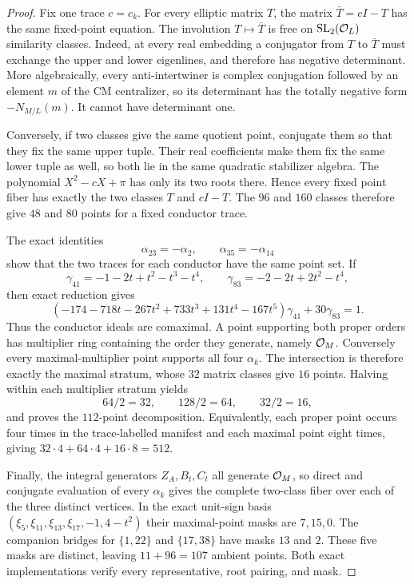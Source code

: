 \begin{proof}
Fix one trace $c=c_k$.  For every elliptic matrix $T$, the matrix
$\bar T=cI-T$ has the same fixed-point equation.  The involution
$T\mapsto\bar T$ is free on $\mathrm{SL}_2(\mathcal O_L)$ similarity classes.  Indeed,
at every real embedding a conjugator from $T$ to $\bar T$ must exchange the
upper and lower eigenlines, and therefore has negative determinant.  More
algebraically, every anti-intertwiner is complex conjugation followed by an
element $m$ of the CM centralizer, so its determinant has the totally negative
form $-N_{M/L}(m)$.  It cannot have determinant one.

Conversely, if two classes give the same quotient point, conjugate them so
that they fix the same upper tuple.  Their real coefficients make them fix the
same lower tuple as well, so both lie in the same quadratic stabilizer algebra.
The polynomial $X^2-cX+\pi$ has only its two roots there.  Hence every fixed
point fiber has exactly the two classes $T$ and $cI-T$.  The $96$ and $160$
classes therefore give $48$ and $80$ points for a fixed conductor trace.

The exact identities
\[
 \alpha_{23}=-\alpha_2,\qquad \alpha_{35}=-\alpha_{14}
\]
show that the two traces for each conductor have the same point set.  If
\[
 \gamma_{41}=-1-2t+t^2-t^3-t^4,
 \qquad \gamma_{83}=-2-2t+2t^2-t^4,
\]
then exact reduction gives
\[
 (-174-718t-267t^2+733t^3+131t^4-167t^5)\gamma_{41}
 +30\gamma_{83}=1.
\]
Thus the conductor ideals are comaximal.  A point supporting both proper
orders has multiplier ring containing the order they generate, namely $\mathcal O_M$.
Conversely every maximal-multiplier point supports all four $\alpha_k$.
The intersection is therefore exactly the maximal stratum, whose $32$ matrix
classes give $16$ points.  Halving within each multiplier stratum yields
\[
64/2=32,\qquad 128/2=64,\qquad 32/2=16,
\]
and proves the $112$-point decomposition.  Equivalently, each proper point
occurs four times in the trace-labelled manifest and each maximal point eight
times, giving $32\cdot4+64\cdot4+16\cdot8=512$.

Finally, the integral generators $Z_A,B_t,C_t$ all generate $\mathcal O_M$, so direct
and conjugate evaluation of every $\alpha_k$ gives the complete two-class
fiber over each of the three distinct vertices.  In the exact unit-sign basis
$(\xi_5,\xi_{11},\xi_{13},\xi_{17},-1,4-t^2)$ their maximal-point masks are
$7,15,0$.  The companion bridges for $\{1,22\}$ and $\{17,38\}$ have masks
$13$ and $2$.  These five masks are distinct, leaving $11+96=107$ ambient
points.  Both exact implementations verify every representative, root
pairing, and mask.
\end{proof}


